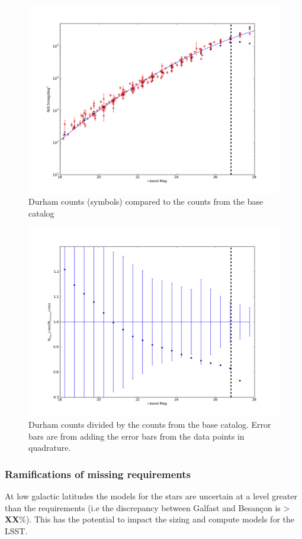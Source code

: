 \documentclass[]{article}
\begin{document}
{\begin{figure}[H]
\centering
\includegraphics[width=5in]{validation_figures/Ngals-i.png}
\caption{Durham counts (symbols) compared to the counts from the base catalog \label{fig:gcounts}}
\end{figure}
\begin{figure}[H]
\centering
\includegraphics[width=5in]{validation_figures/CumulativeFraction_i.png}
\caption{Durham counts divided by the counts from the base catalog.  Error bars are from adding the error bars from the data points in quadrature. \label{fig:gratio}}
\end{figure}

\subsubsection{Ramifications of missing requirements}
At low galactic latitudes the models for the stars are uncertain at a level greater than the requirements (i.e the discrepancy between Galfast and Besan\c{c}on is > {\bf XX}\%).  This has the potential to impact the sizing and compute models for the LSST.

}
\end{document}
